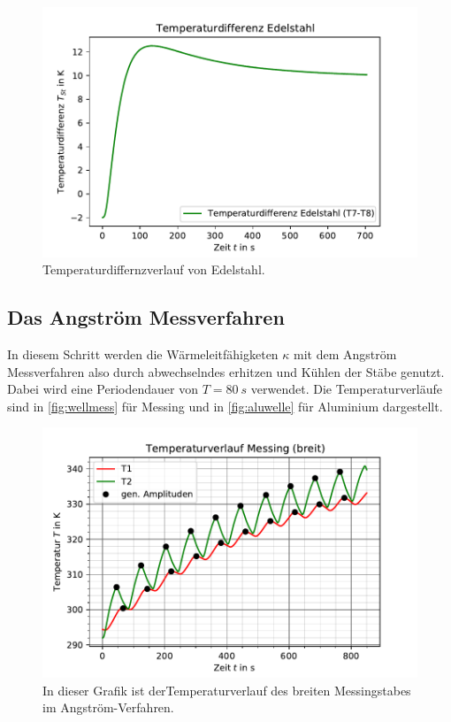     \begin{figure}
        \centering
        \includegraphics{diffed.pdf}
        \caption{Temperaturdiffernzverlauf von Edelstahl.}
        \label{fig:differenz2}
      \end{figure}

\subsection{Das Angström Messverfahren}
\label{sec:auswertung2}
In diesem Schritt werden die Wärmeleitfähigketen $\kappa$ mit dem Angström Messverfahren 
also durch abwechselndes erhitzen und Kühlen der Stäbe genutzt. Dabei wird eine 
Periodendauer von $T=\SI[]{80}[]{s}$ verwendet. Die Temperaturverläufe sind in 
\autoref{fig:wellmess} für Messing und in \autoref{fig:aluwelle} für Aluminium dargestellt.


\begin{figure}
    \centering
    \includegraphics{wellemessing.pdf}
    \caption{In dieser Grafik ist derTemperaturverlauf des breiten Messingstabes im Angström-Verfahren.}
    \label{fig:wellmess}
  \end{figure}


